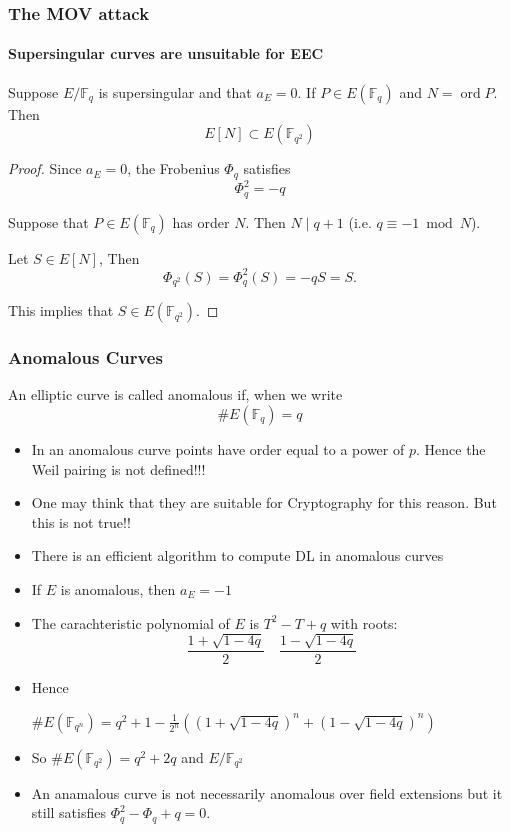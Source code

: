 \documentclass[10pt,handout]{beamer} %
\newcommand{\F}{\mathbb F}
\theoremstyle{definition}
\begin{document}
\begin{frame}
 \frametitle{The MOV attack}
 \framesubtitle{Supersingular curves are unsuitable for EEC}\pause
 
 \begin{Theorem}
  Suppose $E/\F_q$ is supersingular and that $a_E=0$. If $P\in E(\F_q)$ and $N=\operatorname{ord}P$.
  Then
  $$E[N]\subset E(\F_{q^2})$$
 \end{Theorem}\pause
 
\begin{proof} Since $a_E=0$, the Frobenius $\Phi_q$ satisfies
$$\Phi_q^2=-q$$\pause

Suppose that $P\in E(\F_q)$ has order $N$. Then $N\mid q+1$ (i.e. $q\equiv -1\bmod N$).\pause

Let $S\in E[N]$, Then
$$\Phi_{q^2}(S)=\Phi_q^2(S)=-qS=S.$$

This implies that $S\in E(\F_{q^2}).$ 
\end{proof}

\end{frame}

\begin{frame}
 \frametitle{Anomalous Curves}
 
 \begin{Definition}
  An elliptic curve is called \alert{anomalous} if, when we write
  $$\#E(\F_q)=q$$
 \end{Definition}\pause
 
\begin{itemize}[<+-|alert@+>]
\item In an anomalous curve points have order equal to a power of $p$. Hence the Weil pairing is not defined!!!
 \item  One may think that they are suitable for Cryptography for this reason. But this is not true!!
 \item There is an efficient algorithm to compute DL in anomalous curves
 \item If $E$ is anomalous, then $a_E=-1$
 \item The carachteristic polynomial of $E$ is $T^2-T+q$ with roots:
 $$\frac{1+\sqrt{1-4q}}{2}\quad\frac{1-\sqrt{1-4q}}{2}$$
 \item Hence \\
 \centerline{$\#E(\F_{q^n})=q^2+1-\frac1{2^n}\left((1+\sqrt{1-4q})^n+(1-\sqrt{1-4q})^n\right)$}
\item So $\#E(\F_{q^2})=q^2+2q$ and $E/\F_{q^2}$
\item An anamalous curve is not necessarily anomalous over field extensions but it still satisfies
$\Phi_q^2-\Phi_q+q=0$.
 \end{itemize}
\end{frame}
\end{document}
